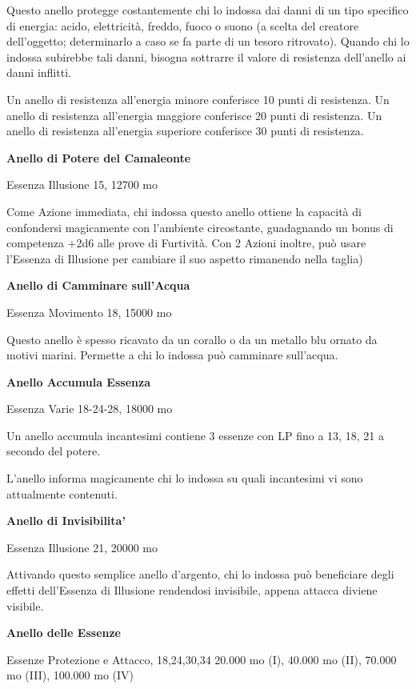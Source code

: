 \documentclass[a4paper,11pt,twoside,openany]{book}
\begin{document}
Questo anello protegge costantemente chi lo indossa dai danni di un tipo specifico di energia: acido, elettricità, freddo, fuoco o suono (a scelta del creatore dell'oggetto; determinarlo a caso se fa parte di un tesoro ritrovato). Quando chi lo indossa subirebbe tali danni, bisogna sottrarre il valore di resistenza dell'anello ai danni inflitti.

Un anello di resistenza all'energia minore conferisce 10 punti di resistenza. Un anello di resistenza all'energia maggiore conferisce 20 punti di resistenza. Un anello di resistenza all'energia superiore conferisce 30 punti di resistenza.

\textbf{Anello di Potere del Camaleonte}

Essenza Illusione 15, 12700 mo

Come Azione immediata, chi indossa questo anello ottiene la capacità di confondersi magicamente con l'ambiente circostante, guadagnando un bonus di competenza +2d6 alle prove di Furtività. Con 2 Azioni inoltre, può usare l'Essenza di Illusione per cambiare il suo aspetto rimanendo nella taglia)

\textbf{Anello di Camminare sull'Acqua}

Essenza Movimento 18, 15000 mo

Questo anello è spesso ricavato da un corallo o da un metallo blu ornato da motivi marini. Permette a chi lo indossa può camminare sull'acqua.

\textbf{Anello Accumula Essenza}

Essenza Varie 18-24-28, 18000 mo

Un anello accumula incantesimi contiene 3 essenze con LP fino a 13, 18, 21 a secondo del potere.

L'anello informa magicamente chi lo indossa su quali incantesimi vi sono attualmente contenuti.

\textbf{Anello di Invisibilita'}

Essenza Illusione 21, 20000 mo

Attivando questo semplice anello d'argento, chi lo indossa può beneficiare degli effetti dell'Essenza di Illusione rendendosi invisibile, appena attacca diviene visibile.

\textbf{Anello delle Essenze}

Essenze Protezione e Attacco, 18,24,30,34 20.000 mo (I), 40.000 mo
(II), 70.000 mo (III), 100.000 mo (IV)
\end{document}
